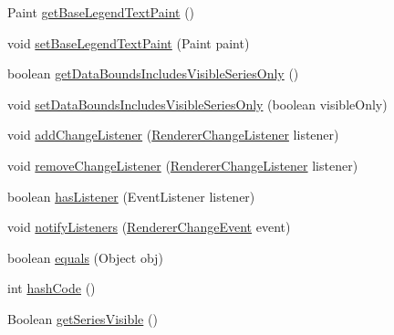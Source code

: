 \begin{DoxyCompactItemize}
\item 
Paint \mbox{\hyperlink{classorg_1_1jfree_1_1chart_1_1renderer_1_1_abstract_renderer_ae7d8a9ff68585b73f0f5cd73f71a6f23}{get\+Base\+Legend\+Text\+Paint}} ()
\item 
void \mbox{\hyperlink{classorg_1_1jfree_1_1chart_1_1renderer_1_1_abstract_renderer_ab11c71f12d757354dde53d37579fc15b}{set\+Base\+Legend\+Text\+Paint}} (Paint paint)
\item 
boolean \mbox{\hyperlink{classorg_1_1jfree_1_1chart_1_1renderer_1_1_abstract_renderer_ab6669cf6da6a5d6cd375908c296e6983}{get\+Data\+Bounds\+Includes\+Visible\+Series\+Only}} ()
\item 
void \mbox{\hyperlink{classorg_1_1jfree_1_1chart_1_1renderer_1_1_abstract_renderer_ace80fa7828b665fe121390ff732aa19d}{set\+Data\+Bounds\+Includes\+Visible\+Series\+Only}} (boolean visible\+Only)
\item 
void \mbox{\hyperlink{classorg_1_1jfree_1_1chart_1_1renderer_1_1_abstract_renderer_a3b6e875102983611e9dfcd174b810920}{add\+Change\+Listener}} (\mbox{\hyperlink{interfaceorg_1_1jfree_1_1chart_1_1event_1_1_renderer_change_listener}{Renderer\+Change\+Listener}} listener)
\item 
void \mbox{\hyperlink{classorg_1_1jfree_1_1chart_1_1renderer_1_1_abstract_renderer_ad051bf1700aac21a28e545e79ba1d7b3}{remove\+Change\+Listener}} (\mbox{\hyperlink{interfaceorg_1_1jfree_1_1chart_1_1event_1_1_renderer_change_listener}{Renderer\+Change\+Listener}} listener)
\item 
boolean \mbox{\hyperlink{classorg_1_1jfree_1_1chart_1_1renderer_1_1_abstract_renderer_ab66450a3f4402b9cf9a51b2b9b742909}{has\+Listener}} (Event\+Listener listener)
\item 
void \mbox{\hyperlink{classorg_1_1jfree_1_1chart_1_1renderer_1_1_abstract_renderer_aa8f8b8a3805788ff3cbfe102a4523a30}{notify\+Listeners}} (\mbox{\hyperlink{classorg_1_1jfree_1_1chart_1_1event_1_1_renderer_change_event}{Renderer\+Change\+Event}} event)
\item 
boolean \mbox{\hyperlink{classorg_1_1jfree_1_1chart_1_1renderer_1_1_abstract_renderer_af53080cd377d0280e820402a50ab17bb}{equals}} (Object obj)
\item 
int \mbox{\hyperlink{classorg_1_1jfree_1_1chart_1_1renderer_1_1_abstract_renderer_af4423ec60e43c61a87f2657ab28228f0}{hash\+Code}} ()
\item 
Boolean \mbox{\hyperlink{classorg_1_1jfree_1_1chart_1_1renderer_1_1_abstract_renderer_a2779761677dd1fc3387fde96068b0b85}{get\+Series\+Visible}} ()
\item 

\end{DoxyCompactItemize}
